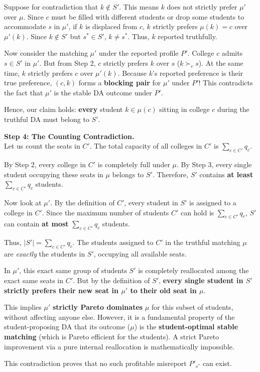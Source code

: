 {  Suppose for contradiction that $k \notin S'$. This means $k$ does not strictly prefer $\mu'$ over $\mu$. Since $c$ must be filled with different students or drop some students to accommodate $s$ in $\mu'$, if $k$ is displaced from $c$, $k$ strictly prefers $\mu(k) = c$ over $\mu'(k)$. Since $k \notin S'$ but $s^* \in S'$, $k \neq s^*$. Thus, $k$ reported truthfully.
  
  Now consider the matching $\mu'$ under the reported profile $P'$. College $c$ admits $s \in S'$ in $\mu'$. But from Step 2, $c$ strictly prefers $k$ over $s$ ($k \succ_c s$). At the same time, $k$ strictly prefers $c$ over $\mu'(k)$. Because $k$'s reported preference is their true preference, $(c, k)$ forms a \textbf{blocking pair} for $\mu'$ under $P'$! This contradicts the fact that $\mu'$ is the stable DA outcome under $P'$.
  
  Hence, our claim holds: \textbf{every} student $k \in \mu(c)$ sitting in college $c$ during the truthful DA must belong to $S'$.

  \medskip
  \noindent\textbf{Step 4: The Counting Contradiction.}\\
  Let us count the seats in $C'$. The total capacity of all colleges in $C'$ is $\sum_{c \in C'} q_c$.
  
  By Step 2, every college in $C'$ is completely full under $\mu$. By Step 3, every single student occupying these seats in $\mu$ belongs to $S'$. Therefore, $S'$ contains \textbf{at least} $\sum_{c \in C'} q_c$ students.
  
  Now look at $\mu'$. By the definition of $C'$, every student in $S'$ is assigned to a college in $C'$. Since the maximum number of students $C'$ can hold is $\sum_{c \in C'} q_c$, $S'$ can contain \textbf{at most} $\sum_{c \in C'} q_c$ students.
  
  Thus, $|S'| = \sum_{c \in C'} q_c$. The students assigned to $C'$ in the truthful matching $\mu$ are \textit{exactly} the students in $S'$, occupying all available seats. 
  
  In $\mu'$, this exact same group of students $S'$ is completely reallocated among the exact same seats in $C'$. But by the definition of $S'$, \textbf{every single student in $S'$ strictly prefers their new seat in $\mu'$ to their old seat in $\mu$}. 
  
  This implies $\mu'$ \textbf{strictly Pareto dominates} $\mu$ for this subset of students, without affecting anyone else. However, it is a fundamental property of the student-proposing DA that its outcome ($\mu$) is the \textbf{student-optimal stable matching} (which is Pareto efficient for the students). A strict Pareto improvement via a pure internal reallocation is mathematically impossible. 
  
  This contradiction proves that no such profitable misreport $P'_{s^*}$ can exist.
}

